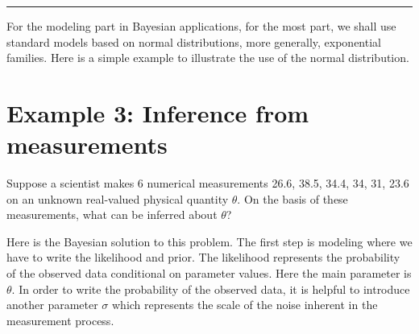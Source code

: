 \documentclass{scrartcl}
\begin{document}
\hrule

For the modeling part in Bayesian applications, for the most part, we
shall use standard models based on normal distributions, more
generally, exponential families. Here is a simple example to
illustrate the use of the normal distribution. 

\section{Example 3: Inference from measurements}

  Suppose a scientist makes 6 numerical measurements 26.6, 38.5, 34.4,
  34, 31, 23.6 on an unknown real-valued physical quantity
  $\theta$. On the basis of these measurements, what can be inferred
  about $\theta$?

Here is the Bayesian solution to this problem. The first step is
modeling where we have to write the likelihood and prior. The
likelihood represents the probability of the observed data conditional
on parameter values. Here the main parameter is $\theta$. In order to
write the probability of the observed data, it is helpful to introduce
another parameter $\sigma$ which represents the scale of the noise
inherent in the measurement process. 
\end{document}
